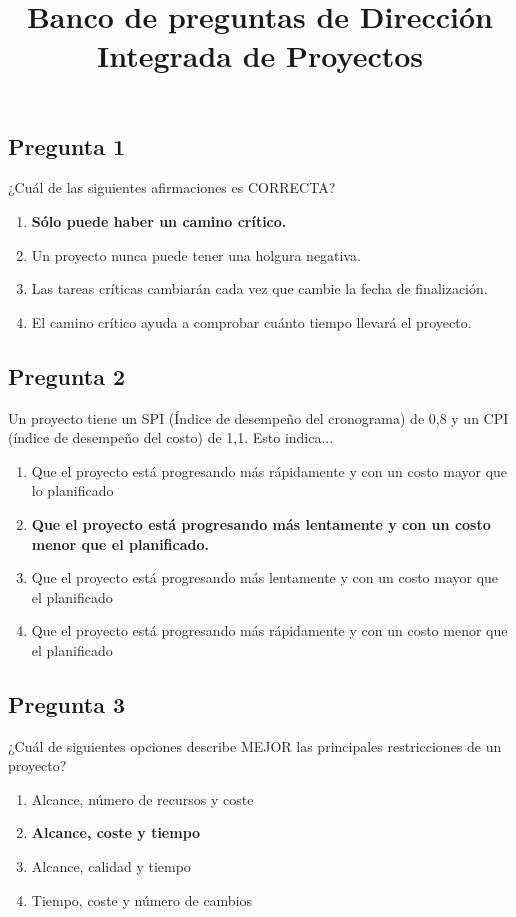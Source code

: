 \documentclass[11pt,a4paper]{article}
\title{Banco de preguntas de Dirección Integrada de Proyectos}
\author{}
\date{}
\begin{document}
\maketitle

\subsection*{Pregunta 1}
¿Cuál de las siguientes afirmaciones es CORRECTA?

\begin{enumerate}[label=\alph*)]
  \item \textbf{Sólo puede haber un camino crítico.}
  \item Un proyecto nunca puede tener una holgura negativa.
  \item Las tareas críticas cambiarán cada vez que cambie la fecha de finalización.
  \item El camino crítico ayuda a comprobar cuánto tiempo llevará el proyecto.
\end{enumerate}

\subsection*{Pregunta 2}
Un proyecto tiene un SPI (Índice de desempeño del cronograma) de 0,8 y un CPI (índice de desempeño del costo) de 1,1. Esto indica...

\begin{enumerate}[label=\alph*)]
  \item Que el proyecto está progresando más rápidamente y con un costo mayor que lo planificado
  \item \textbf{Que el proyecto está progresando más lentamente y con un costo menor que el planificado.}
  \item Que el proyecto está progresando más lentamente y con un costo mayor que el planificado
  \item Que el proyecto está progresando más rápidamente y con un costo menor que el planificado
\end{enumerate}

\subsection*{Pregunta 3}
¿Cuál de siguientes opciones describe MEJOR las principales restricciones de un proyecto?

\begin{enumerate}[label=\alph*)]
  \item Alcance, número de recursos y coste
  \item \textbf{Alcance, coste y tiempo}
  \item Alcance, calidad y tiempo
  \item Tiempo, coste y número de cambios
\end{enumerate}
\end{document}

